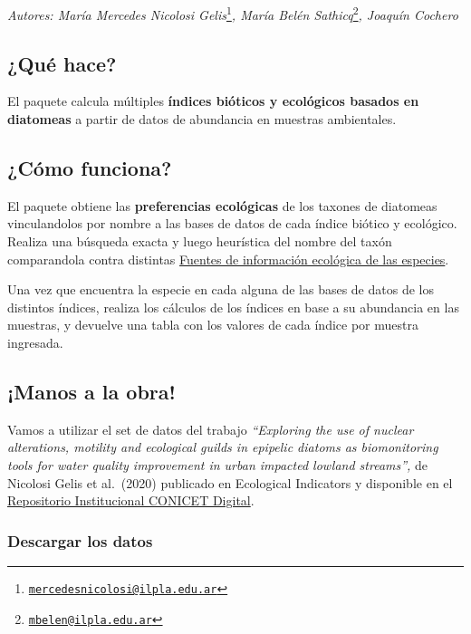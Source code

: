 \documentclass[
]{book}
\begin{document}
\emph{Autores: María Mercedes Nicolosi Gelis}\footnote{\href{mailto:mercedesnicolosi@ilpla.edu.ar}{\nolinkurl{mercedesnicolosi@ilpla.edu.ar}}}\emph{, María Belén Sathicq}\footnote{\href{mailto:mbelen@ilpla.edu.ar}{\nolinkurl{mbelen@ilpla.edu.ar}}}\emph{, Joaquín Cochero}

\hypertarget{quuxe9-hace}{%
\subsection{¿Qué hace?}\label{quuxe9-hace}}

El paquete calcula múltiples \textbf{índices bióticos y ecológicos basados en diatomeas} a partir de datos de abundancia en muestras ambientales.

\hypertarget{cuxf3mo-funciona}{%
\subsection{¿Cómo funciona?}\label{cuxf3mo-funciona}}

El paquete obtiene las \textbf{preferencias ecológicas} de los taxones de diatomeas vinculandolos por nombre a las bases de datos de cada índice biótico y ecológico. Realiza una búsqueda exacta y luego heurística del nombre del taxón comparandola contra distintas \protect\hyperlink{fuentes-de-informaciuxf3n-ecoluxf3gica-de-las-especies}{Fuentes de información ecológica de las especies}.

Una vez que encuentra la especie en cada alguna de las bases de datos de los distintos índices, realiza los cálculos de los índices en base a su abundancia en las muestras, y devuelve una tabla con los valores de cada índice por muestra ingresada.

\hypertarget{manos-a-la-obra-1}{%
\subsection{¡Manos a la obra!}\label{manos-a-la-obra-1}}

Vamos a utilizar el set de datos del trabajo \emph{``Exploring the use of nuclear alterations, motility and ecological guilds in epipelic diatoms as biomonitoring tools for water quality improvement in urban impacted lowland streams'',} de Nicolosi Gelis et al.~(2020) \citep{nicolosigelis2020} publicado en Ecological Indicators y disponible en el \href{https://ri.conicet.gov.ar/handle/11336/128216}{Repositorio Institucional CONICET Digital}.

\hypertarget{descargar-los-datos}{%
\subsubsection{\texorpdfstring{\textbf{Descargar los datos}}{Descargar los datos}}\label{descargar-los-datos}}
\end{document}
